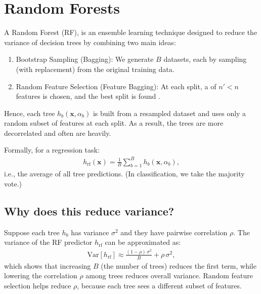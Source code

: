 \documentclass[letterpaper,10pt,english]{jupyterBook}
\begin{document}
\section{Random Forests}
\label{\detokenize{03:random-forests}}
\sphinxAtStartPar
A Random Forest (RF), is an ensemble learning technique designed to reduce the variance of decision trees by combining two main ideas:
\begin{enumerate}
%
\item {} 
\sphinxAtStartPar
Bootstrap Sampling (Bagging): We generate \(B\)  datasets, each by sampling (with replacement) from the original training data.

\item {} 
\sphinxAtStartPar
Random Feature Selection (Feature Bagging): At each split, a  of \(n' < n\) features is chosen, and the best split is found .

\end{enumerate}

\sphinxAtStartPar
Hence, each tree \(h_b(\mathbf{x}, \alpha_b)\) is built from a  resampled dataset and uses only a random subset of features at each split. As a result, the trees are more decorrelated and often are  heavily.

\sphinxAtStartPar
Formally, for a regression task:
\begin{equation*}
\begin{split}
  h_{\mathrm{rf}}(\mathbf{x}) = \frac{1}{B} \sum_{b=1}^{B} h_b(\mathbf{x}, \alpha_b),
\end{split}
\end{equation*}
\sphinxAtStartPar
i.e., the average of all tree predictions. (In classification, we take the majority vote.)


\subsection{Why does this reduce variance?}
\label{\detokenize{03:why-does-this-reduce-variance}}
\sphinxAtStartPar
Suppose each tree \(h_b\) has variance \(\sigma^2\) and they have pairwise correlation \(\rho\). The variance of the RF predictor \(h_{\mathrm{rf}}\) can be approximated as:
\begin{equation*}
\begin{split}
  \mathrm{Var}[h_{\mathrm{rf}}] \approx \frac{(1 - \rho)\,\sigma^2}{B} + \rho\,\sigma^2,
\end{split}
\end{equation*}
\sphinxAtStartPar
which shows that increasing \(B\) (the number of trees) reduces the first term, while lowering the correlation \(\rho\) among trees reduces overall variance. Random feature selection helps reduce \(\rho\), because each tree sees a different subset of features.
\end{document}
